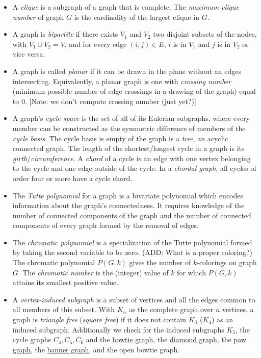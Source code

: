\documentclass[12pt]{article}
\newcommand{\bowtiegraph}{\href{http://mathworld.wolfram.com/ButterflyGraph.html}{bowtie graph}}
\newcommand{\diamondgraph}{\href{http://mathworld.wolfram.com/DiamondGraph.html}{diamond graph}}
\newcommand{\pawgraph}{\href{http://mathworld.wolfram.com/PawGraph.html}{paw graph}}
\newcommand{\bannergraph}{\href{http://mathworld.wolfram.com/BannerGraph.html}{banner graph}}
\begin{document}
\begin{itemize}
\item A \textit{clique} is a subgraph of a graph that is complete. The \textit{maximum clique number} of graph $G$ is the cardinality of the largest clique in $G$. 

\item A graph is \textit{bipartite} if there exists $V_1$ and $V_2$ two disjoint subsets of the nodes, with $V_1 \cup V_2 = V$, and for every edge $(i,j) \in E$,  $i$ is in $V_1$ and $j$ is in $V_2$ or vice versa.

\item A graph is called \textit{planar} if it can be drawn in the plane without an edges intersecting. Equivalently, a planar graph is one with \textit{crossing number} (minimum possible number of edge crossings in a drawing of the graph) equal to 0. [Note: we don't compute crossing number (just yet?)]

\item A graph's \textit{cycle space} is the set of all of its Eulerian subgraphs, where every member can be constructed as the symmetric difference of members of the \textit{cycle basis}. 
The cycle basis is empty of the graph is a \textit{tree}, an acyclic connected graph.
The length of the shortest/longest cycle in a graph is its \textit{girth}/\textit{circumference}.
A \textit{chord} of a cycle is an edge with one vertex belonging to the cycle and one edge outside of the cycle.
In a \textit{chordal graph}, all cycles of order four or more have a cycle chord.   
 
\item The \textit{Tutte polynomial} for a graph is a bivariate polynomial which encodes information about the graph's connectedness. 
It requires knowledge of the number of connected components of the graph and the number of connected components of every graph formed by the removal of edges. 

\item The \textit{chromatic polynomial} is a specialization of the Tutte polynomial formed by taking the second variable to be zero. 
(ADD: What is a proper coloring?)
The chromatic polynomial $P(G,k)$ gives the number of $k$-colorings on graph $G$. 
The \textit{chromatic number} is the (integer) value of $k$ for which $P(G,k)$ attains its smallest positive value. 

\item A \textit{vertex-induced subgraph} is a subset of vertices and all the edges common to all members of this subset. 
With $K_n$ as the complete graph over $n$ vertices, a graph is \textit{triangle free} (\textit{square free}) if it does not contain $K_3$ ($K_4$) as an induced subgraph.
Additionally we check for the induced subgraphs $K_5$, the cycle graphs $C_4, C_5, C_6$ and the \bowtiegraph, the \diamondgraph, the \pawgraph, the \bannergraph, and the open bowtie graph. 


\end{itemize}
\end{document}
